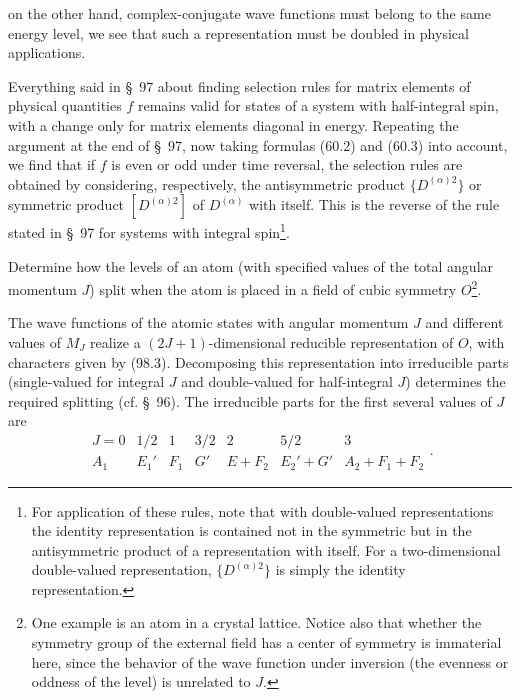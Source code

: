 on the other hand, complex-conjugate wave functions must belong to the same energy level, we see that such a representation must be doubled in physical applications.

Everything said in \S~97 about finding selection rules for matrix elements of physical quantities $f$ remains valid for states of a system with half-integral spin, with a change only for matrix elements diagonal in energy. Repeating the argument at the end of \S~97, now taking formulas (60.2) and (60.3) into account, we find that if $f$ is even or odd under time reversal, the selection rules are obtained by considering, respectively, the antisymmetric product $\{D^{(\alpha)2}\}$ or symmetric product $[D^{(\alpha)2}]$ of $D^{(\alpha)}$ with itself. This is the reverse of the rule stated in \S~97 for systems with integral spin\footnote{For application of these rules, note that with double-valued representations the identity representation is contained not in the symmetric but in the antisymmetric product of a representation with itself. For a two-dimensional double-valued representation, $\{D^{(\alpha)2}\}$ is simply the identity representation.}.

\ProblemHeading Determine how the levels of an atom (with specified values of the total angular momentum $J$) split when the atom is placed in a field of cubic symmetry $O$\footnote{One example is an atom in a crystal lattice. Notice also that whether the symmetry group of the external field has a center of symmetry is immaterial here, since the behavior of the wave function under inversion (the evenness or oddness of the level) is unrelated to $J$.}.

\SolutionHeading The wave functions of the atomic states with angular momentum $J$ and different values of $M_J$ realize a $(2J+1)$-dimensional reducible representation of $O$, with characters given by (98.3). Decomposing this representation into irreducible parts (single-valued for integral $J$ and double-valued for half-integral $J$) determines the required splitting (cf. \S~96). The irreducible parts for the first several values of $J$ are
\[
\begin{array}{c|c|c|c|c|c|c|c}
J=0&1/2&1&3/2&2&5/2&3\\ \hline
A_1&E_1'&F_1&G'&E+F_2&E_2'+G'&A_2+F_1+F_2
\end{array}.
\]


